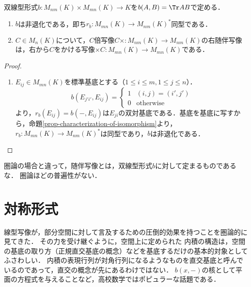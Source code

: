 \documentclass[uplatex, dvipdfmx]{jsreport}
\begin{document}
\begin{proposition}[随伴写像は行列の転置に当たる]
    双線型形式$b:M_{nm}(K)\times M_{mn}(K)\to K$を$b(A,B)=\Tr AB$で定める．
    \begin{enumerate}
        \item $b$は非退化である，即ち$r_b:M_{mn}(K)\to M_{nm}(K)^*$同型である．
        \item $C\in M_n(K)$について，$C$倍写像$C\times:M_{nm}(K)\to M_{nm}(K)$の右随伴写像は，右から$C$をかける写像$\times C:M_{mn}(K)\to M_{mn}(K)$である．
    \end{enumerate}
\end{proposition}
\begin{proof}\mbox{}
    \begin{enumerate}
        \item $E_{ij}\in M_{mn}(K)$を標準基底とする（$1\le i\le m,1\le j\le n$）．
        \[b(E_{j'i'},E_{ij})=\begin{cases}
            1&(i,j)=(i',j')\\
            0&\mathrm{otherwise}
        \end{cases}\]
        より，$r_b(E_{ij})=b(-,E_{ij})$は$E_{ji}$の双対基底である．基底を基底に写すから，命題\ref{prop-characterization-of-isomorphism}より，$r_b:M_{mn}(K)\to M_{nm}(K)^*$は同型であり，$b$は非退化である．

    \end{enumerate}
\end{proof}
\begin{remarks}
    圏論の場合と違って，随伴写像とは，双線型形式$b$に対して定まるものであるな．
    圏論ほどの普遍性がない．
\end{remarks}

\section{対称形式}

\begin{tcolorbox}[colframe=ForestGreen, colback=ForestGreen!10!white, breakable,
    title=単一空間上の双線型形式を考える]
    線型写像が，部分空間に対して言及するための圧倒的効果を持つことを圏論的に見てきた．
    その力を受け継ぐように，空間上に定められた
    内積の構造は，空間の基底の取り方（正規直交基底の概念）などを基底するだけの基本的対象としてふさわしい．
    内積の表現行列が対角行列になるようなものを直交基底と呼んでいるのであって，直交の概念が先にあるわけではない．
    $b(x,-)$の核として平面の方程式を与えることなど，高校数学ではポピュラーな話題である．
\end{tcolorbox}
\end{document}
